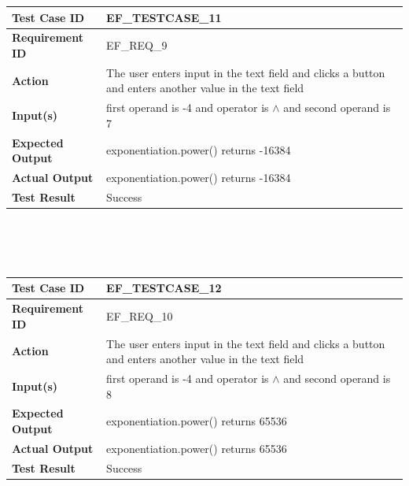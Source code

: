\documentclass[11pt, english]{report}
\begin{document}
\setlength{\tabcolsep}{18pt}
\renewcommand{\arraystretch}{1.5}
\begin{tabular}{ |p{4cm}|p{8cm}| }
\hline
\textbf{Test Case ID} &  EF\_TESTCASE\_11 \\ \hline 
\textbf{Requirement ID} & EF\_REQ\_9\\ \hline
\textbf{Action} & The user enters input in the text field and clicks a button and enters another value in the text field\\ \hline
\textbf{Input(s)} & first operand is -4 and operator is $\wedge$ and second operand is 7 \\ \hline
\textbf{Expected Output} & exponentiation.power() returns -16384 \\ \hline
\textbf{Actual Output} & exponentiation.power() returns -16384 \\ \hline
\textbf{Test Result} & Success \\ 
\hline
\end{tabular} \\ \\ \\

\setlength{\tabcolsep}{18pt}
\renewcommand{\arraystretch}{1.5}
\begin{tabular}{ |p{4cm}|p{8cm}| }
\hline
\textbf{Test Case ID} &  EF\_TESTCASE\_12 \\ \hline 
\textbf{Requirement ID} & EF\_REQ\_10\\ \hline
\textbf{Action} & The user enters input in the text field and clicks a button and enters another value in the text field\\ \hline
\textbf{Input(s)} & first operand is -4 and operator is $\wedge$ and second operand is 8 \\ \hline
\textbf{Expected Output} & exponentiation.power() returns 65536 \\ \hline
\textbf{Actual Output} & exponentiation.power() returns 65536 \\ \hline
\textbf{Test Result} & Success \\ 
\hline
\end{tabular} \\ \\ \\
\end{document}
